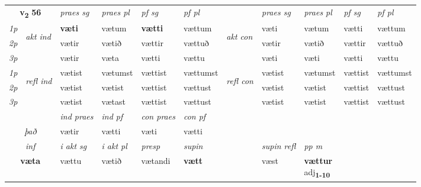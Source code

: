 \noindent
\begin{tabular}{lllllllllll} \toprule
\multicolumn{2}{c}{\textbf{v{\textsubscript{2}}} \Large{\textbf{56}}}  &  \textit{praes sg}  & \textit{praes pl}  &\textit{ pf sg} & \textit{pf pl} &  &  \textit{praes sg}  & \textit{praes pl}  & \textit{pf sg} & \textit{pf pl } \\*
	\cmidrule{3-6} \cmidrule{8-11}
 {\textit{1p}} & \multirow{3}{*}{\begin{turn}{90}\textit{akt ind}\end{turn}} & \textbf{væti} & vætum & \textbf{vætti} & vættum & \multirow{3}{*}{\begin{turn}{90}\textit{akt con}\end{turn}} &væti & vætum & vætti & vættum\\*
 {\textit{2p}} &  &  vætir  & vætið & vættir & vættuð & & vætir & vætið & vættir & vættuð \\*
{\textit{3p}} &  & vætir & væta & vætti & vættu & & væti & væti& vætti & vættu \\*
\cmidrule{3-6} \cmidrule{8-11}
 {\textit{1p}} & \multirow{3}{*}{\begin{turn}{90}\textit{refl ind}\end{turn}}  & vætist & vætumst & vættist & vættumst & \multirow{3}{*}{\begin{turn}{90}\textit{refl con}\end{turn}}  &vætist & vætumst & vættist & vættumst \\*
 {\textit{2p}} &  & vætist & vætist & vættist & vættust & &vætist & vætist & vættist & vættust \\*
 {\textit{3p}}  & & vætist & vætast & vættist & vættust & & vætist & vætist& vættist & vættust \\*
\cmidrule{3-6} \cmidrule{8-11}

   & &  \textit{ind praes} & \textit{ind pf} & \textit{con praes} & \textit{con pf} \\*
\multicolumn{2}{c}{ \textit{það} } & vætir & vætti & væti & vætti \\*

\cmidrule{3-9}
   \multicolumn{2}{c}{\textit{inf}}  & \textit{i akt sg} & \textit{i akt pl}   & \textit{presp} & \textit{supin} && \textit{supin refl} & \textit{pp m} \\*
  \multicolumn{2}{c}{\textbf{væta}} & vættu  & vætið   & vætandi &  \textbf{vætt} && væst & \specialcell{\textbf{vættur} \\ adj\textbf{\textsubscript{1-10}}} \\*
\end{tabular}

